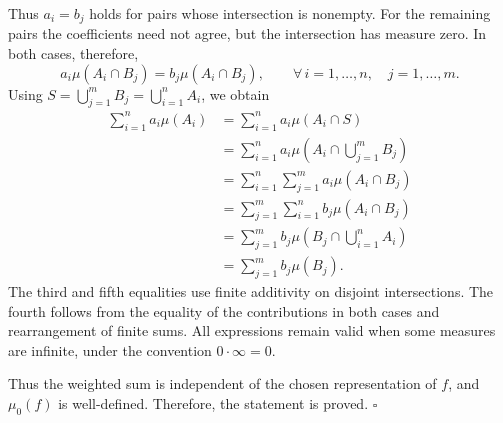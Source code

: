 \documentclass[10pt,a4paper]{article}
\begin{document}
Thus $a_i=b_j$ holds for pairs whose intersection is nonempty. For the
remaining pairs the coefficients need not agree, but the intersection has
measure zero. In both cases, therefore,
\[
a_i\mu(A_i\cap B_j)=b_j\mu(A_i\cap B_j),
\qquad\forall\,i=1,\ldots,n,\quad j=1,\ldots,m.
\]
Using $S=\bigcup_{j=1}^{m}B_j=\bigcup_{i=1}^{n}A_i$, we obtain
\[
\begin{aligned}
\sum_{i=1}^{n}a_i\mu(A_i)
&=\sum_{i=1}^{n}a_i\mu(A_i\cap S)\\
&=\sum_{i=1}^{n}a_i\mu\left(A_i\cap\bigcup_{j=1}^{m}B_j\right)\\
&=\sum_{i=1}^{n}\sum_{j=1}^{m}a_i\mu(A_i\cap B_j)\\
&=\sum_{j=1}^{m}\sum_{i=1}^{n}b_j\mu(A_i\cap B_j)\\
&=\sum_{j=1}^{m}b_j\mu\left(B_j\cap\bigcup_{i=1}^{n}A_i\right)\\
&=\sum_{j=1}^{m}b_j\mu(B_j).
\end{aligned}
\]
The third and fifth equalities use finite additivity on disjoint intersections. The fourth follows from the equality of the contributions in both cases and rearrangement of finite sums. All expressions remain valid when some measures are infinite, under the convention $0\cdot\infty=0$.

Thus the weighted sum is independent of the chosen representation of $f$, and $\mu_0(f)$ is well-defined. Therefore, the statement is proved. $\square$
\end{document}

